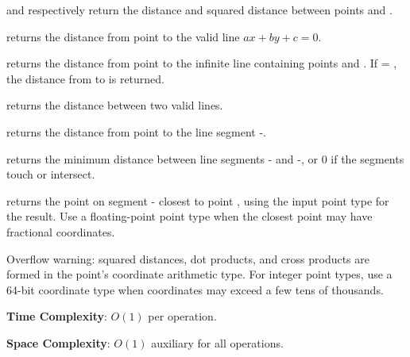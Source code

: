 \begin{compactitem}
  \item {} and  respectively return the distance and squared distance between points  and .
  \item {} returns the distance from point  to the valid line $ax + by + c = 0$.
  \item {} returns the distance from point  to the infinite line containing points  and . If  = , the distance from  to  is returned.
  \item {} returns the distance between two valid lines.
  \item {} returns the distance from point  to the line segment -.
  \item {} returns the minimum distance between line segments - and -, or $0$ if the segments touch or intersect.
  \item {} returns the point on segment - closest to point , using the input point type for the result. Use a floating-point point type when the closest point may have fractional coordinates.
\end{compactitem}

Overflow warning: squared distances, dot products, and cross products are formed in the point's coordinate arithmetic type. For integer point types, use a 64-bit coordinate type when coordinates may exceed a few tens of thousands.

\textbf{Time Complexity}: $O(1)$ per operation.

\textbf{Space Complexity}: $O(1)$ auxiliary for all operations.

